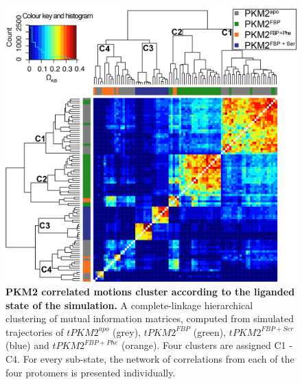\begin{figure}[!ht]
\includegraphics[scale=0.7]{ch6_fig11_substate_cluster.png}
\caption[PKM2 correlated motions cluster according to the liganded state of the simulation.]{\textbf{PKM2 correlated motions cluster according to the liganded state of the simulation.} A complete-linkage hierarchical clustering of mutual information matrices, computed from simulated trajectories of $tPKM2^{apo}$ (grey), $tPKM2^{FBP}$ (green), $tPKM2^{FBP+Ser}$ (blue) and $tPKM2^{FBP+Phe}$ (orange). Four clusters are assigned C1 - C4. For every sub-state, the network of correlations from each of the four protomers is presented individually.}
\label{fig:mi_cluster}
\end{figure}
%
%
\clearpage



